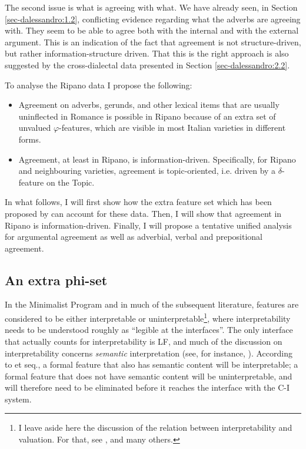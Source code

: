 \documentclass[output=paper
,modfonts
,nonflat]{langsci/langscibook}
\begin{document}
The second issue is what is agreeing with what. We have already seen, in Section \ref{sec-dalessandro:1.2}, conflicting evidence regarding what the adverbs are agreeing with. They seem to be able to agree both with the internal and with the external argument. This is an indication of the fact that agreement is not structure-driven, but rather information-structure driven. That this is the right approach is also suggested by the cross-dialectal data presented in Section \ref{sec-dalessandro:2.2}.

To analyse the Ripano data I propose the following:
\begin{itemize}
	\item
		Agreement on adverbs, gerunds, and other lexical items that are usually uninflected in Romance is possible in Ripano because of an extra set of unvalued $\varphi $-features, which are visible in most Italian varieties in different forms.
	\item 
		Agreement, at least in Ripano, is information-driven. Specifically, for Ripano and neighbouring varieties, agreement is topic-oriented, i.e. driven by a $\delta $-feature on the Topic. 
\end{itemize}
In what follows, I will first show how the extra feature set which has been proposed by \citet{D`Alessandro2017} can account for these data. Then, I will show that agreement in Ripano is information-driven. Finally, I will propose a tentative unified analysis for argumental agreement as well as adverbial, verbal and prepositional agreement.

\subsection{An extra phi-set} \label{sec-dalessandro:3.2}
In the Minimalist Program \citep{Chomsky1995} and in much of the subsequent literature, features are considered to be either interpretable or uninterpretable\footnote{
I leave aside here the discussion of the relation between interpretability and valuation. For that, see \citet{Pesetsky_Torrego2007}, \citet{Zeijlstra2008} and many others.}, where interpretability needs to be understood roughly as “legible at the interfaces”. The only interface that actually counts for interpretability is LF, and much of the discussion on interpretability concerns \textit{semantic} interpretation (see, for instance, \citealt{Zeijlstra2008}). According to \citet{Zeijlstra2008} et seq., a formal feature that also has semantic content will be interpretable; a formal feature that does not have semantic content will be uninterpretable, and will therefore need to be eliminated before it reaches the interface with the C-I system.
\end{document}
